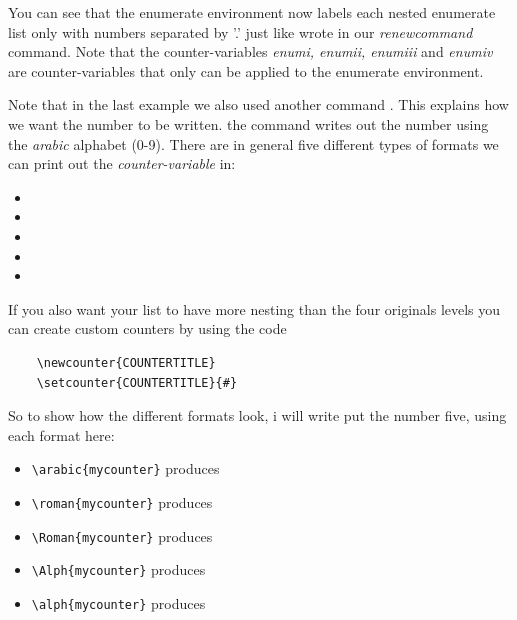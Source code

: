 You can see that the enumerate environment now labels each nested enumerate list only with numbers separated by '.' just like wrote in our \textit{renewcommand} command.
Note that the counter-variables \textit{enumi, enumii, enumiii} and \textit{enumiv} are counter-variables that only can be applied to the enumerate environment.

Note that in the last example we also used another command \textbf{\textit{}}. This explains how we want the number to be written.
the  command writes out the number using the \textit{arabic} alphabet (0-9). There are in general five different types of formats we can print out the \textit{counter-variable}
in:
\begin{itemize}
    \item {}
    \item {}
    \item {}
    \item {}
    \item {}
\end{itemize}

If you also want your list to have more nesting than the four originals levels you can create custom counters by using the code
\begin{center}
    \begin{verbatim}
    \newcounter{COUNTERTITLE}    
    \setcounter{COUNTERTITLE}{#}
    \end{verbatim}
\end{center}

So to show how the different formats look, i will write put the number five, using each format here:

\setcounter{mycounter}{5}
\begin{itemize}
    \item \verb|\arabic{mycounter}| produces 
    \item \verb|\roman{mycounter}| produces  
    \item \verb|\Roman{mycounter}| produces 
    \item \verb|\Alph{mycounter}| produces 
    \item \verb|\alph{mycounter}| produces 
\end{itemize}

